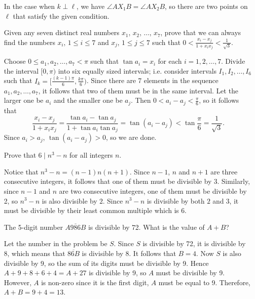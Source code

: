 \begin{remark}
    In the case when $k \perp \ell$, we have $\angle AX_1B = \angle AX_2B$, so
    there are two points on $\ell$ that satisfy the given condition.
\end{remark}

\begin{question}
    Given any seven distinct real numbers $x_{1}$, $x_{2}$, $\ldots$, $x_{7}$,
    prove that we can always find the numbers $x_{i}$, $1 \leq i\leq 7$ and
    $x_{j}$, $1 \leq j\leq 7$ such that $0 < \frac{x_{i} - x_{j}}{1 +
    x_{i}x_{j}} < \frac{1}{\sqrt{3}}$.
\end{question}
\begin{solution}
    Choose $0 \leq a_1, a_2, \ldots, a_7 < \pi$ such that $\tan a_i = x_i$ for
    each $i = 1, 2, \ldots, 7$. Divide the interval $[0, \pi)$ into six equally
    sized intervals; i.e. consider intervals $I_1, I_2, \ldots, I_6$ such that
    $I_k = [\frac{(k - 1) \pi}{6}, \frac{k \pi}{6} )$. Since there are 7
    elements in the sequence $a_1, a_2, \ldots, a_7$, it follows that two of
    them must be in the same interval. Let the larger one be $a_i$ and the
    smaller one be $a_j$. Then $0 < a_i - a_j < \frac{\pi}{6}$, so it follows
    that
    \[ \frac{x_i - x_j}{1 + x_i x_j} = \frac{\tan a_i - \tan a_j}{1 + \tan a_i
    \tan a_j} = \tan(a_i - a_j) < \tan \frac{\pi}{6} = \frac{1}{\sqrt{3}}.\] 
    Since $a_i > a_j$, $\tan(a_i - a_j) > 0$, so we are done.     
\end{solution}

\begin{question}
    Prove that $6 \mid n^3 - n$ for all integers $n$.
\end{question}
\begin{solution}
    Notice that $n^3 - n = (n - 1)n(n + 1)$. Since $n - 1$, $n$ and $n + 1$ are
    three consecutive integers, it follows that one of them must be divisible
    by 3. Similarly, since $n - 1$ and $n$ are two consecutive
    integers, one of them must be divisible by 2, so $n^3 - n$ is also divisible by
    $2$. Since $n^3 - n$ is divisible by both $2$ and $3$, it must be divisible
    by their least common multiple which is 6.
\end{solution}
{}
\label{sol: Sample Problems P15}
\begin{question}
    The 5-digit number $\overline{A986B}$ is divisible by 72. What is the value of $A + B$?
\end{question}
\begin{solution}
    Let the number in the problem be $S$. Since $S$ is divisible by 72, it is
    divisible by 8, which means that $\overline{86B}$ is divisible by 8. It
    follows that $B = 4$. Now $S$ is also divisible by 9, so the sum of its
    digits must be divisible by 9. Hence $A + 9 + 8 + 6 + 4 = A + 27$ is
    divisible by 9, so $A$ must be divisible by 9. However, $A$ is non-zero
    since it is the first digit, $A$ must be equal to 9. Therefore, $A + B = 9
    + 4 = 13$.
\end{solution}

